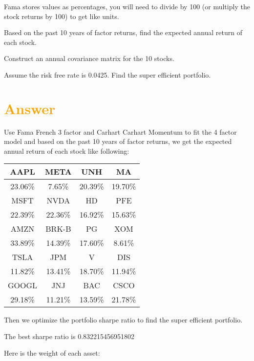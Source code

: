\documentclass[11pt,en]{elegantpaper}
\begin{document}
Fama stores values as percentages, you will need to divide by 100 (or multiply the stock returns by 100) to get like units.

Based on the past 10 years of factor returns, find the expected annual return of each stock.

Construct an annual covariance matrix for the 10 stocks.

Assume the risk free rate is 0.0425. Find the super efficient portfolio.

\section*{\textcolor{orange}{Answer}}

Use Fama French 3 factor and Carhart Carhart Momentum to fit the 4 factor model and based on the past 10 years of factor returns, we get the expected annual return of each stock like following:


\begin{table}[htbp]
    \centering
    \begin{tabular}{|c|c|c|c|}
    \hline
    AAPL    & META    & UNH     & MA      \\ \hline
    23.06\% & 7.65\%  & 20.39\% & 19.70\% \\ \hline
    MSFT    & NVDA    & HD      & PFE     \\ \hline
    22.39\% & 22.36\% & 16.92\% & 15.63\% \\ \hline
    AMZN    & BRK-B   & PG      & XOM     \\ \hline
    33.89\% & 14.39\% & 17.60\% & 8.61\%  \\ \hline
    TSLA    & JPM     & V       & DIS     \\ \hline
    11.82\% & 13.41\% & 18.70\% & 11.94\% \\ \hline
    GOOGL   & JNJ     & BAC     & CSCO    \\ \hline
    29.18\% & 11.21\% & 13.59\% & 21.78\% \\ \hline
    \end{tabular}
\end{table}

Then we optimize the portfolio sharpe ratio to find the super efficient portfolio.

The best sharpe ratio is 0.832215456951802

Here is the weight of each asset:
\end{document}
